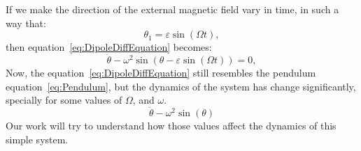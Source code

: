 If we make the direction of the external magnetic field vary in time, in such a way that:
\begin{equation}
    \theta_1 = \varepsilon \sin(\Omega t),
\end{equation}
then equation~\ref{eq:DipoleDiffEquation} becomes: 
\begin{equation}
    \ddot{\theta} -\omega^2\sin(\theta - \varepsilon \sin(\Omega t)) =0,
\end{equation}
Now, the equation~\ref{eq:DipoleDiffEquation} still resembles the pendulum equation~\ref{eq:Pendulum}, but the dynamics of the system has change significantly, specially for some values of $\Omega$, and $\omega$. 
\begin{equation}
    \ddot{\theta} - \omega^2 \sin(\theta)
    \label{eq:Pendulum}
\end{equation}
Our work will try to understand how those values affect the dynamics of this simple system. 



